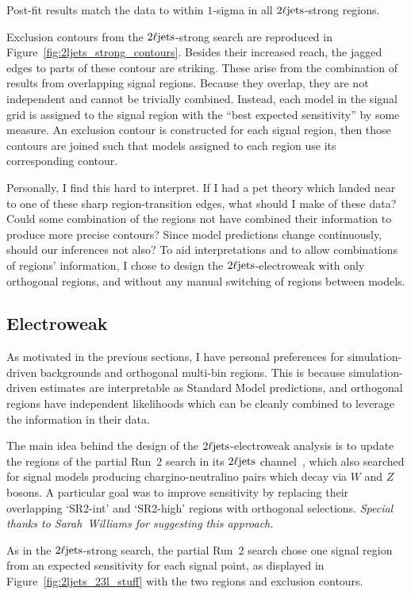 Post-fit results match the data to within $1$-sigma in all $2\ell\mathrm{jets}$-strong
regions.

Exclusion contours from the $2\ell\mathrm{jets}$-strong search are reproduced in
Figure~\ref{fig:2ljets_strong_contours}.
Besides their increased reach, the jagged edges to parts of these contour are
striking.
These arise from the combination of results from overlapping signal regions.
Because they overlap, they are not independent and cannot be trivially
combined.
Instead, each model in the signal grid is assigned to the signal region
with the ``best expected sensitivity'' by some measure.
An exclusion contour is constructed for each signal region, then those contours
are joined such that models assigned to each region use its corresponding
contour.

Personally, I find this hard to interpret.
If I had a pet theory which landed near to one of these sharp
region-transition edges, what should I make of these data?
Could some combination of the regions not have combined their information to
produce more precise contours?
Since model predictions change continuously, should our inferences not also?
To aid interpretations and to allow combinations of regions'
information, I chose to design the $2\ell\mathrm{jets}$-electroweak with only orthogonal
regions, and without any manual switching of regions between models.


\FloatBarrier
\subsection{Electroweak}
\label{sec:2ljets_origins_electroweak}
As motivated in the previous sections, I have personal preferences for
simulation-driven backgrounds and orthogonal multi-bin regions.
This is because simulation-driven estimates are interpretable as
Standard Model predictions,
and orthogonal regions have independent likelihoods which can be cleanly
combined to leverage the information in their data.

The main idea behind the design of the $2\ell\mathrm{jets}$-electroweak analysis is to
update the regions of the partial Run~2 search in its $2\ell\mathrm{jets}$
channel~\cite{atlas_23l_SUSY_2016_24}, which also searched for signal models
producing chargino-neutralino pairs which decay via $W$ and $Z$ bosons.
A particular goal was to improve sensitivity by replacing their overlapping
`SR2-int' and `SR2-high' regions with orthogonal selections.
\emph{Special thanks to Sarah~Williams for suggesting this approach.}

As in the $2\ell\mathrm{jets}$-strong search, the partial Run~2 search chose one
signal region from an expected sensitivity for each signal point,
as displayed in
Figure~\ref{fig:2ljets_23l_stuff}
with the two regions and exclusion contours.

